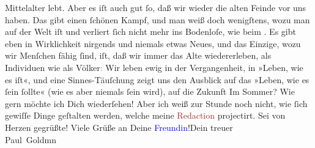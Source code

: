                Mittelalter lebt. Aber es iſt auch gut ſo, daß \strikeout{\textcolor{gray}{m}} wir wieder die alten Feinde vor uns haben.  Das gibt einen ſchönen Kampf, und {\pb}man weiß
               doch wenigſtens, \strikeout{\textcolor{gray}{e}} wozu man auf der Welt iſt und verliert ſich nicht mehr ins Bodenloſe, wie beim
                  \label{K_L02839-32v}\label{K_L02839-32h}. Es gibt eben in Wirklichkeit nirgends  und
               niemals etwas Neues, und das Einzige, wozu wir Menſchen fähig ſind, iſt, daß wir
               immer das Alte wiedererleben, als Individuen wie als Völker\textcolor{gray}{:} Wir
               leben ewig in der Vergangenheit, in »Leben, wie es iſt«, und eine Sinnes-Täuſchung
               zeigt uns den Ausblick auf das »Leben, wie es ſein ſollte« (wie es aber niemals ſein
               wird), \strikeout{\textcolor{gray}{da}} auf die Zukunft{\dotsfive}\pend
           \pstart
           Im Sommer? Wie gern möchte ich Dich wiederſehen! Aber ich weiß zur Stunde noch nicht,
               wie ſich gewiſſe Dinge geſtalten werden, welche meine \textcolor{brown}{Redaction}{} projectirt. Sei von Herzen
               gegrüßte!\pend
           \pstart
           Viele Grüße an Deine \textcolor{blue}{Freundin}{}!\hfill Dein treuer {\\}\spacefill\mbox{Paul Goldmn}\pend
           \endnumbering{}\begin{anhang}\end{anhang}
      